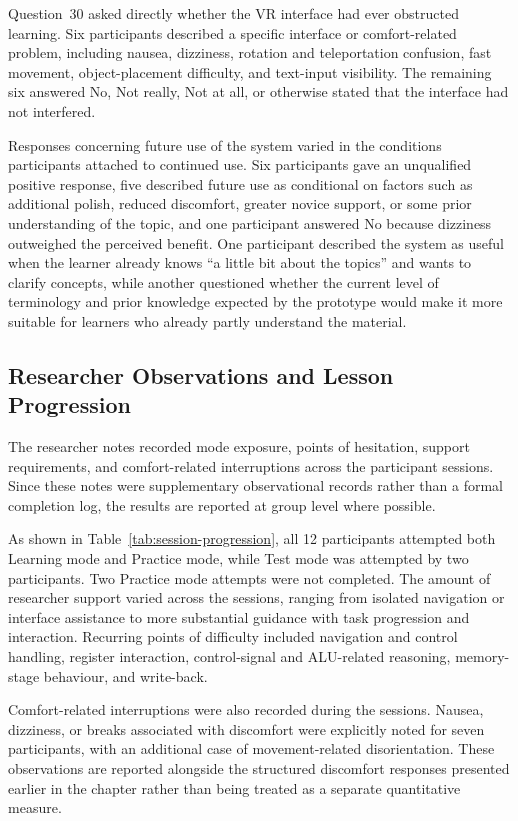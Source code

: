 Question~30 asked directly whether the VR interface had ever obstructed learning. Six participants described a specific interface or comfort-related problem, including nausea, dizziness, rotation and teleportation confusion, fast movement, object-placement difficulty, and text-input visibility. The remaining six answered No, Not really, Not at all, or otherwise stated that the interface had not interfered.

Responses concerning future use of the system varied in the conditions participants attached to continued use. Six participants gave an unqualified positive response, five described future use as conditional on factors such as additional polish, reduced discomfort, greater novice support, or some prior understanding of the topic, and one participant answered No because dizziness outweighed the perceived benefit. One participant described the system as useful when the learner already knows ``a little bit about the topics'' and wants to clarify concepts, while another questioned whether the current level of terminology and prior knowledge expected by the prototype would make it more suitable for learners who already partly understand the material.

\subsection{Researcher Observations and Lesson Progression}

The researcher notes recorded mode exposure, points of hesitation, support requirements, and comfort-related interruptions across the participant sessions. Since these notes were supplementary observational records rather than a formal completion log, the results are reported at group level where possible.

As shown in Table~\ref{tab:session-progression}, all 12 participants attempted both Learning mode and Practice mode, while Test mode was attempted by two participants. Two Practice mode attempts were not completed. The amount of researcher support varied across the sessions, ranging from isolated navigation or interface assistance to more substantial guidance with task progression and interaction. Recurring points of difficulty included navigation and control handling, register interaction, control-signal and ALU-related reasoning, memory-stage behaviour, and write-back.

Comfort-related interruptions were also recorded during the sessions. Nausea, dizziness, or breaks associated with discomfort were explicitly noted for seven participants, with an additional case of movement-related disorientation. These observations are reported alongside the structured discomfort responses presented earlier in the chapter rather than being treated as a separate quantitative measure. 


